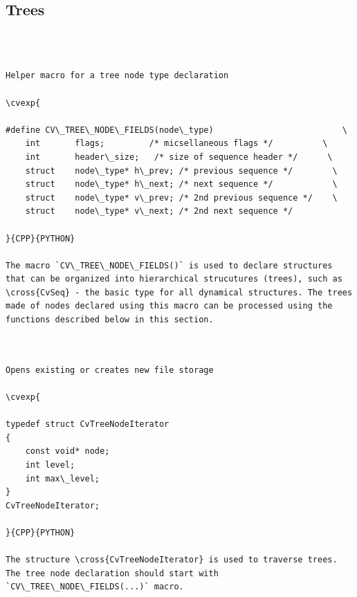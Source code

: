 \subsection{Trees}
\begin{verbatim}


\end{verbatim}
\label{CV_TREE_NODE_FIELDS}
\begin{verbatim}

Helper macro for a tree node type declaration

\cvexp{

#define CV\_TREE\_NODE\_FIELDS(node\_type)                          \
    int       flags;         /* micsellaneous flags */          \
    int       header\_size;   /* size of sequence header */      \
    struct    node\_type* h\_prev; /* previous sequence */        \
    struct    node\_type* h\_next; /* next sequence */            \
    struct    node\_type* v\_prev; /* 2nd previous sequence */    \
    struct    node\_type* v\_next; /* 2nd next sequence */

}{CPP}{PYTHON}

The macro `CV\_TREE\_NODE\_FIELDS()` is used to declare structures that can be organized into hierarchical strucutures (trees), such as \cross{CvSeq} - the basic type for all dynamical structures. The trees made of nodes declared using this macro can be processed using the functions described below in this section.


\end{verbatim}
\label{CvTreeNodeIterator}
\begin{verbatim}

Opens existing or creates new file storage

\cvexp{

typedef struct CvTreeNodeIterator
{
    const void* node;
    int level;
    int max\_level;
}
CvTreeNodeIterator;

}{CPP}{PYTHON}

The structure \cross{CvTreeNodeIterator} is used to traverse trees. The tree node declaration should start with `CV\_TREE\_NODE\_FIELDS(...)` macro.


\end{verbatim}
\label{InitTreeNodeIterator}
